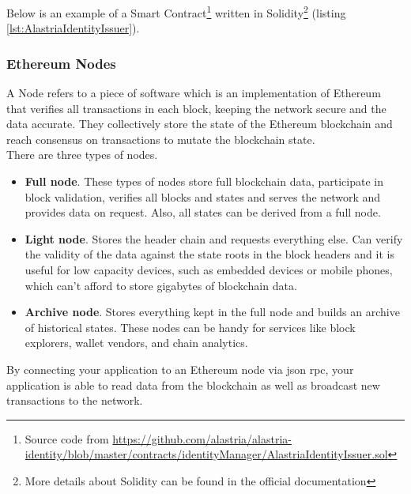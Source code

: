 \documentclass[a4paper, 12pt]{article} %
\begin{document}
            Below is an example of a Smart Contract\footnote{Source code from \url{https://github.com/alastria/alastria-identity/blob/master/contracts/identityManager/AlastriaIdentityIssuer.sol}} written in Solidity\footnote{More details about Solidity can be found in the official documentation\cite{solidity}} (listing  \ref{lst:AlastriaIdentityIssuer}).
            
            

        \subsubsection{Ethereum Nodes}
            A Node refers to a piece of software which is an implementation of Ethereum that verifies all transactions in each block, keeping the network secure and the data accurate. They collectively store the state of the Ethereum blockchain and reach consensus on transactions to mutate the blockchain state.\\
            
            There are three types of nodes.
            \begin{itemize}
                \item \textbf{Full node}. These types of nodes store full blockchain data, participate in block validation, verifies all blocks and states and serves the network and provides data on request. Also, all states can be derived from a full node.
                \item \textbf{Light node}. Stores the header chain and requests everything else. Can verify the validity of the data against the state roots in the block headers and it is useful for low capacity devices, such as embedded devices or mobile phones, which can't afford to store gigabytes of blockchain data.
                \item \textbf{Archive node}. Stores everything kept in the full node and builds an archive of historical states. These nodes can be handy for services like block explorers, wallet vendors, and chain analytics.
            \end{itemize}
            By connecting your application to an Ethereum node via \acrshort{json} \acrshort{rpc}, your application is able to read data from the blockchain as well as broadcast new transactions to the network.
\end{document}
